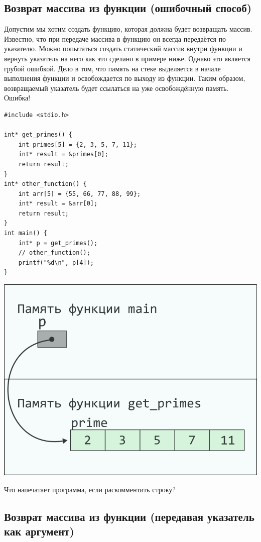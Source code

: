 \documentclass{article}
\begin{document}
\subsection*{Возврат массива из функции (ошибочный способ)}
Допустим мы хотим создать функцию, которая должна будет возвращать массив.
Известно, что при передаче массива в функцию он всегда передаётся по указателю.
Можно попытаться создать статический массив внутри функции и вернуть указатель на него как
это сделано в примере ниже.
Однако это является грубой ошибкой. Дело в том, что память на стеке
выделяется в начале выполнения функции и освобождается по выходу из функции.
Таким образом, возвращаемый указатель будет ссылаться на уже освобождённую память. Ошибка!
\begin{multicols}{2}
\begin{lstlisting}
#include <stdio.h>

int* get_primes() {
	int primes[5] = {2, 3, 5, 7, 11};
	int* result = &primes[0];
	return result;
}
int* other_function() {
	int arr[5] = {55, 66, 77, 88, 99};
	int* result = &arr[0];
	return result;
}
int main() {
	int* p = get_primes();
	// other_function();
	printf("%d\n", p[4]);
}
\end{lstlisting}
\columnbreak
\begin{center}
\includegraphics[scale=1]{../images/pointer_schemes/function_return_stack_array.png}
\end{center}
\end{multicols}
Что напечатает программа, если раскомментить строку?

\subsection*{Возврат массива из функции (передавая указатель как аргумент)}
\end{document}

